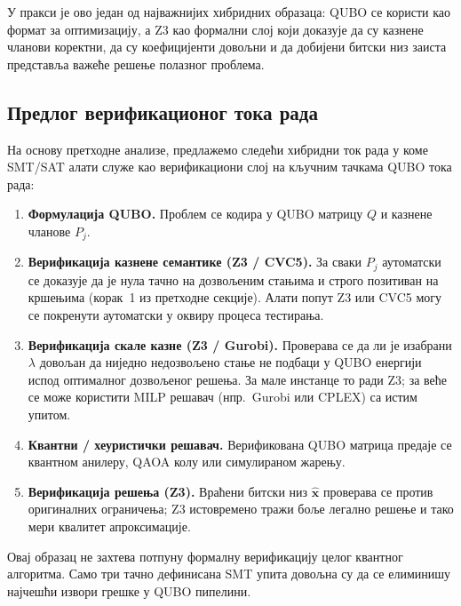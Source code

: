 \begin{remark}
У пракси је ово један од најважнијих хибридних образаца:
QUBO се користи као формат за оптимизацију, а Z3 као формални слој
који доказује да су казнене чланови коректни, да су коефицијенти
довољни и да добијени битски низ заиста представља важеће решење
полазног проблема.
\end{remark}

\subsection{Предлог верификационог тока рада}

На основу претходне анализе, предлажемо следећи хибридни ток рада
у коме SMT/SAT алати служе као верификациони слој на кључним тачкама
QUBO тока рада:

\begin{enumerate}[nosep]
  \item \textbf{Формулација QUBO.}
        Проблем се кодира у QUBO матрицу $Q$ и казнене чланове $P_j$.
  \item \textbf{Верификација казнене семантике (Z3 / CVC5).}
        За сваки $P_j$ аутоматски се доказује да је нула тачно
        на дозвољеним стањима и строго позитиван на кршењима
        (корак~1 из претходне секције).
        Алати попут Z3 или CVC5 могу се покренути аутоматски
        у оквиру процеса тестирања.
  \item \textbf{Верификација скале казне (Z3 / Gurobi).}
        Проверава се да ли је изабрани $\lambda$ довољан да
        ниједно недозвољено стање не подбаци у QUBO енергији
        испод оптималног дозвољеног решења.
        За мале инстанце то ради Z3; за веће се може користити
        MILP решавач (нпр.\ Gurobi или CPLEX) са истим упитом.
  \item \textbf{Квантни / хеуристички решавач.}
        Верификована QUBO матрица предаје се квантном анилеру,
        QAOA колу или симулираном жарењу.
  \item \textbf{Верификација решења (Z3).}
        Враћени битски низ $\hat{\mathbf{x}}$ проверава се
        против оригиналних ограничења; Z3 истовремено тражи
        боље легално решење и тако мери квалитет апроксимације.
\end{enumerate}

Овај образац не захтева потпуну формалну верификацију целог квантног
алгоритма. Само три тачно дефинисана SMT упита довољна су да се
елиминишу најчешћи извори грешке у QUBO пипелини.


